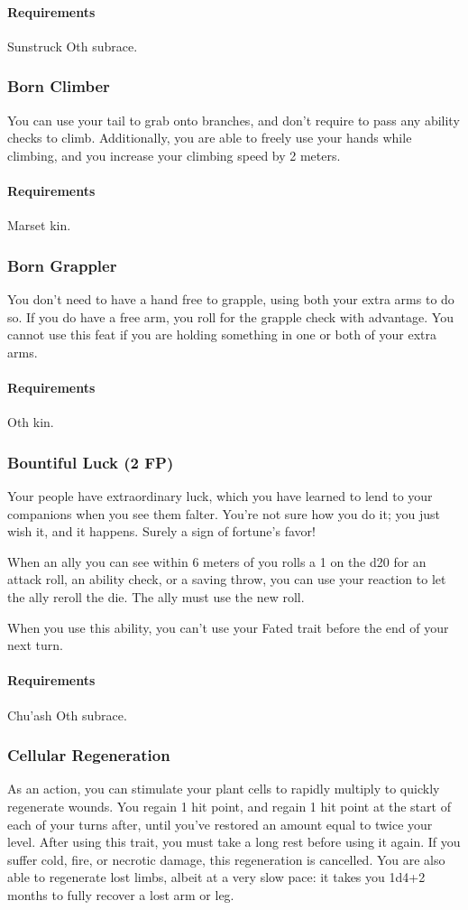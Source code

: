     \paragraph{Requirements} Sunstruck Oth subrace.
\subsubsection{Born Climber} \label{feat::bornclimber}
    You can use your tail to grab onto branches, and don't require to pass any ability checks to climb.
    Additionally, you are able to freely use your hands while climbing, and you increase your climbing speed by 2 meters.
    \paragraph{Requirements} Marset kin.
\subsubsection{Born Grappler} \label{feat::borngrappler}
    You don't need to have a hand free to grapple, using both your extra arms to do so.
    If you do have a free arm, you roll for the grapple check with advantage.
    You cannot use this feat if you are holding something in one or both of your extra arms.
    \paragraph{Requirements} Oth kin.
\subsubsection{Bountiful Luck (2 FP)} \label{feat::bountifulluck}
    Your people have extraordinary luck, which you have learned to lend to your companions when you see them falter.
    You're not sure how you do it; you just wish it, and it happens.
    Surely a sign of fortune's favor!

    When an ally you can see within 6 meters of you rolls a 1 on the d20 for an attack roll, an ability check, or a saving throw, you can use your reaction to let the ally reroll the die.
    The ally must use the new roll.

    When you use this ability, you can't use your Fated trait before the end of your next turn.
    \paragraph{Requirements} Chu'ash Oth subrace.
\subsubsection{Cellular Regeneration} \label{feat::cellularregeneration}
    As an action, you can stimulate your plant cells to rapidly multiply to quickly regenerate wounds.
    You regain 1 hit point, and regain 1 hit point at the start of each of your turns after, until you've restored an amount equal to twice your level.
    After using this trait, you must take a long rest before using it again.
    If you suffer cold, fire, or necrotic damage, this regeneration is cancelled.
    You are also able to regenerate lost limbs, albeit at a very slow pace: it takes you 1d4+2 months to fully recover a lost arm or leg.
